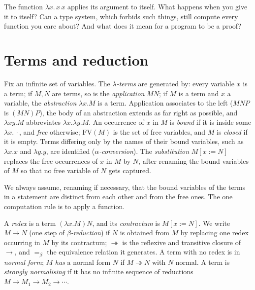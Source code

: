 \begin{think}
The function $\lambda x.\,x\,x$ applies its argument to itself. What happens when you give it to itself? Can a type system, which forbids such things, still compute every function you care about? And what does it mean for a program to be a proof?
\end{think}

\section{Terms and reduction}\label{sec:terms}

\begin{definition}\label{def:lambdaterm}
Fix an infinite set of variables. The \emph{$\lambda$-terms} are generated by: every variable $x$ is a term; if $M,N$ are terms, so is the \emph{application} $MN$; if $M$ is a term and $x$ a variable, the \emph{abstraction} $\lambda x.M$ is a term. Application associates to the left ($MNP$ is $(MN)P$), the body of an abstraction extends as far right as possible, and $\lambda xy.M$ abbreviates $\lambda x.\lambda y.M$. An occurrence of $x$ in $M$ is \emph{bound} if it is inside some $\lambda x.\,\cdot$, and \emph{free} otherwise; $\mathrm{FV}(M)$ is the set of free variables, and $M$ is \emph{closed} if it is empty. Terms differing only by the names of their bound variables, such as $\lambda x.x$ and $\lambda y.y$, are identified (\emph{$\alpha$-conversion}). The \emph{substitution} $M[x:=N]$ replaces the free occurrences of $x$ in $M$ by $N$, after renaming the bound variables of $M$ so that no free variable of $N$ gets captured.
\end{definition}

We always assume, renaming if necessary, that the bound variables of the terms in a statement are distinct from each other and from the free ones. The one computation rule is to apply a function.

\begin{definition}\label{def:beta}
A \emph{redex} is a term $(\lambda x.M)N$, and its \emph{contractum} is $M[x:=N]$. We write $M\to N$ (one step of \emph{$\beta$-reduction}) if $N$ is obtained from $M$ by replacing one redex occurring in $M$ by its contractum; $\twoheadrightarrow$ is the reflexive and transitive closure of $\to$, and $=_\beta$ the equivalence relation it generates. A term with no redex is in \emph{normal form}; $M$ \emph{has} a normal form $N$ if $M\twoheadrightarrow N$ with $N$ normal. A term is \emph{strongly normalising} if it has no infinite sequence of reductions $M\to M_1\to M_2\to\cdots$.
\end{definition}

